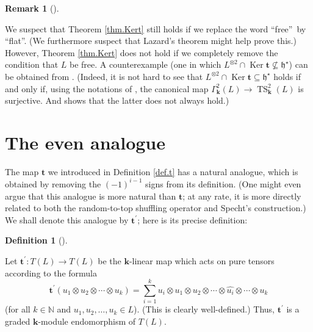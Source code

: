 \documentclass[numbers=enddot,12pt,final,onecolumn,notitlepage]{scrartcl}%
\theoremstyle{definition}
\newtheorem{defi}[theo]{Definition}
\newenvironment{definition}[1][]
{\begin{defi}[#1]\begin{leftbar}}
{\end{leftbar}\end{defi}}
\newtheorem{remk}[theo]{Remark}
\newenvironment{remark}[1][]
{\begin{remk}[#1]\begin{leftbar}}
{\end{leftbar}\end{remk}}
\let\sumnonlimits\sum
\renewcommand{\sum}{\sumnonlimits\limits}
\begin{document}
\begin{remark}
\label{rmk.Kert.free}We suspect that Theorem \ref{thm.Kert} still holds if we
replace the word \textquotedblleft free\textquotedblright\ by
\textquotedblleft flat\textquotedblright. (We furthermore suspect that
Lazard's theorem might help prove this.) However, Theorem \ref{thm.Kert} does
not hold if we completely remove the condition that $L$ be free. A
counterexample (one in which $L^{\otimes2}\cap\operatorname*{Ker}%
\mathbf{t}\not \subseteq \mathfrak{h}^{\star}$) can be obtained from
\cite[Example 4.6]{Lundkv08}. (Indeed, it is not hard to see that
$L^{\otimes2}\cap\operatorname*{Ker}\mathbf{t}\subseteq\mathfrak{h}^{\star}$
holds if and only if, using the notations of \cite{Lundkv08}, the canonical
map $\Gamma_{\mathbf{k}}^{2}\left(  L\right)  \rightarrow\operatorname*{TS}%
\nolimits_{\mathbf{k}}^{2}\left(  L\right)  $ is surjective. And \cite[Example
4.6]{Lundkv08} shows that the latter does not always hold.)
\end{remark}

\section{The even analogue}

The map $\mathbf{t}$ we introduced in Definition \ref{def.t} has a natural
analogue, which is obtained by removing the $\left(  -1\right)  ^{i-1}$ signs
from its definition. (One might even argue that this analogue is more natural
than $\mathbf{t}$; at any rate, it is more directly related to both the
random-to-top shuffling operator and Specht's construction.) We shall denote
this analogue by $\mathbf{t}^{\prime}$; here is its precise definition:

\begin{definition}
\label{def.t'}Let $\mathbf{t}^{\prime}:T\left(  L\right)  \rightarrow T\left(
L\right)  $ be the $\mathbf{k}$-linear map which acts on pure tensors
according to the formula%
\[
\mathbf{t}^{\prime}\left(  u_{1}\otimes u_{2}\otimes\cdots\otimes
u_{k}\right)  =\sum_{i=1}^{k}u_{i}\otimes u_{1}\otimes u_{2}\otimes
\cdots\otimes\widehat{u_{i}}\otimes\cdots\otimes u_{k}%
\]
(for all $k\in\mathbb{N}$ and $u_{1},u_{2},\ldots,u_{k}\in L$). (This is
clearly well-defined.) Thus, $\mathbf{t}^{\prime}$ is a graded $\mathbf{k}%
$-module endomorphism of $T\left(  L\right)  $.
\end{definition}
\end{document}
